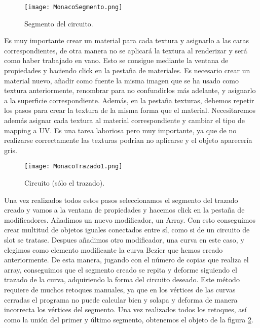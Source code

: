 \begin{figure}[h]
	\centering
	\texttt{[image: MonacoSegmento.png]}
	\caption{Segmento del circuito.} \label{fig:monacosegmento}
\end{figure}

Es muy importante crear un material para cada textura y asignarlo a las caras correspondientes, de otra manera no se aplicará la textura al renderizar y será como haber trabajado en vano. Esto se consigue mediante la ventana de propiedades y haciendo click en la pestaña de materiales. Es necesario crear un material nuevo, añadir como fuente la misma imagen que se ha usado como textura anteriormente, renombrar para no confundirlos más adelante, y asignarlo a la superficie correspondiente. Además, en la pestaña texturas, debemos repetir los pasos para crear la textura de la misma forma que el material. Necesitaremos además asignar cada textura al material correspondiente y cambiar el tipo de mapping a UV. Es una tarea laboriosa pero muy importante, ya que de no realizarse correctamente las texturas podrían no aplicarse y el objeto aparecería gris.

\begin{figure}[hb]
	\centering
	\texttt{[image: MonacoTrazado1.png]}
	\caption{Circuito (sólo el trazado).} \label{fig:monacotrazado1}
\end{figure}

Una vez realizados todos estos pasos seleccionamos el segmento del trazado creado y vamos a la ventana de propiedades y hacemos click en la pestaña de modificadores. Añadimos un nuevo modificador, un Array. Con esto conseguimos crear multitud de objetos iguales conectados entre sí, como si de un circuito de slot se tratase. Despues añadimos otro modificador, una curva en este caso, y elegimos como elemento modificante la curva Bezier que hemos creado anteriormente. De esta manera, jugando con el número de copias que realiza el array, conseguimos que el segmento creado se repita y deforme siguiendo el trazado de la curva, adquiriendo la forma del circuito deseado. Este método requiere de muchos retoques manuales, ya que en los vértices de las curvas cerradas el programa no puede calcular bien y solapa y deforma de manera incorrecta los vértices del segmento. Una vez realizados todos los retoques, así como la unión del primer y último segmento, obtenemos el objeto de la figura \ref{fig:monacotrazado1}.

